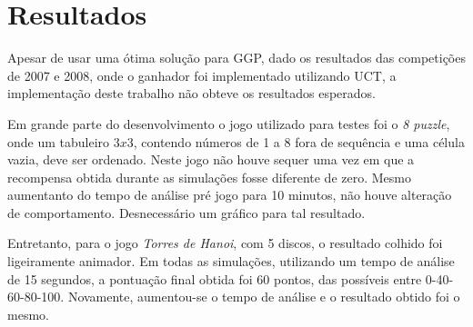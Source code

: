\chapter{Resultados}
Apesar de usar uma ótima solução para GGP, dado os resultados das competições de 2007 e 2008, onde o ganhador foi implementado utilizando UCT, a implementação deste trabalho não obteve os resultados esperados. 

Em grande parte do desenvolvimento o jogo utilizado para testes foi o \textit{8 puzzle}, onde um tabuleiro $3x3$, contendo números de 1 a 8 fora de sequência e uma célula vazia, deve ser ordenado. Neste jogo não houve sequer uma vez em que a recompensa obtida durante as simulações fosse diferente de zero. Mesmo aumentanto do tempo de análise pré jogo para 10 minutos, não houve alteração de comportamento. Desnecessário um gráfico para tal resultado.

Entretanto, para o jogo \textit{Torres de Hanoi}, com 5 discos, o resultado colhido foi ligeiramente animador. Em todas as simulações, utilizando um tempo de análise de 15 segundos, a pontuação final obtida foi 60 pontos, das possíveis entre 0-40-60-80-100.  Novamente, aumentou-se o tempo de análise e o resultado obtido foi o mesmo.